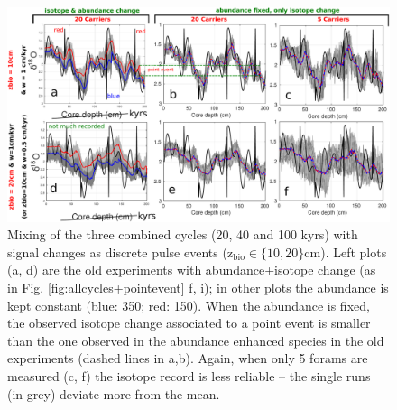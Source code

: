 \documentclass[a4paper,oneside,9pt]{article}
\begin{document}
\begin{figure}[hbp]
\begin{center}
	\includegraphics[width=1.0\textwidth]{../figures/../figures/JustABU_3ycles_combined_pointevents.pdf}
	\caption{Mixing of the three combined cycles (20, 40 and 100 kyrs) with signal changes as discrete pulse events (z$_\mathrm{bio} \in \{10,20 \}$cm). 
	Left plots (a, d) are the old experiments with abundance+isotope change (as in Fig. \ref{fig:allcycles+pointevent} f, i); 
	in other plots the abundance is kept constant (blue: 350; red: 150). 
	When the abundance is fixed, the observed isotope change associated to a point event is smaller than the one observed in the abundance enhanced species in the old experiments (dashed lines in a,b). 
	Again, when only 5 forams are measured (c, f) the isotope record is less reliable -- the single runs (in grey) deviate more from the mean.}\label{fig:x5pointevent}
\end{center}
\end{figure}
\end{document}
